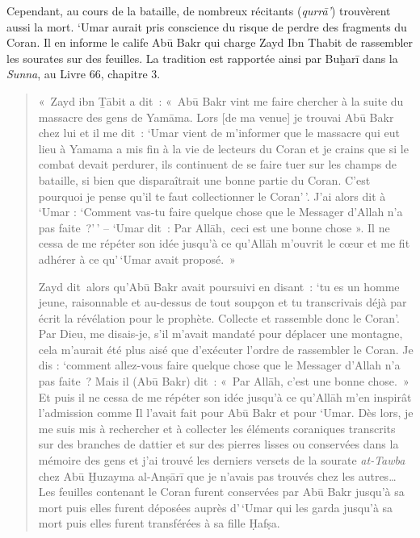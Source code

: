 Cependant, au cours de la bataille, de nombreux récitants
(\emph{qurrā'}) trouvèrent aussi la mort. `Umar aurait pris conscience
du risque de perdre des fragments du Coran. Il en informe le calife Abū
Bakr qui charge Zayd Ibn Thabit de rassembler les sourates sur des
feuilles. La tradition est rapportée ainsi par Buḫarī dans la
\emph{Sunna}, au Livre 66, chapitre 3.
\begin{quote}
    
«~Zayd ibn Ṯābit a dit~: «~Abū Bakr vint me faire chercher à la suite du
massacre des gens de Yamāma. Lors {[}de ma venue{]} je trouvai Abū Bakr
chez lui et il me dit~: `Umar vient de m'informer que le massacre qui
eut lieu à Yamama a mis fin à la vie de lecteurs du Coran et je crains
que si le combat devait perdurer, ils continuent de se faire tuer sur
les champs de bataille, si bien que disparaîtrait une bonne partie du
Coran. C'est pourquoi je pense qu'il te faut collectionner le Coran'\,'.
J'ai alors dit à `Umar : `Comment vas-tu faire quelque chose que le
Messager d'Allah n'a pas faite~?'\,' -- `Umar dit~: Par Allāh,~ceci est
une bonne chose ». Il ne cessa de me répéter son idée jusqu'à ce
qu'Allāh m'ouvrit le cœur et me fit adhérer à ce qu'\,`Umar avait
proposé.~»

Zayd dit~alors qu'Abū Bakr avait poursuivi en disant~: `tu es un homme
jeune, raisonnable et au-dessus de tout soupçon et tu transcrivais déjà
par écrit la révélation pour le prophète. Collecte et rassemble donc le
Coran'. Par Dieu, me disais-je, s'il m'avait mandaté pour déplacer une
montagne, cela m'aurait été plus aisé que d'exécuter l'ordre de
rassembler le Coran. Je dis : `comment allez-vous faire quelque chose
que le Messager d'Allah n'a pas faite~? Mais il (Abū Bakr) dit~: «~Par
Allāh, c'est une bonne chose.~» Et puis il ne cessa de me répéter son
idée jusqu'à ce qu'Allāh m'en inspirât l'admission comme Il l'avait fait
pour Abū Bakr et pour `Umar. Dès lors, je me suis mis à rechercher et à
collecter les éléments coraniques transcrits sur des branches de dattier
et sur des pierres lisses ou conservées dans la mémoire des gens et j'ai
trouvé les derniers versets de la sourate \emph{at-Tawba} chez Abū
Ḫuzayma al-Anṣārī que je n'avais pas trouvés chez les autres\ldots{} Les
feuilles contenant le Coran furent conservées par Abū Bakr jusqu'à sa
mort puis elles furent déposées auprès d'\,`Umar qui les garda jusqu'à
sa mort puis elles furent transférées à sa fille Ḥafṣa.
\end{quote}

